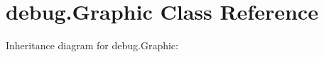 \hypertarget{classdebug_1_1_graphic}{}\section{debug.\+Graphic Class Reference}
\label{classdebug_1_1_graphic}


Inheritance diagram for debug.\+Graphic\+:
